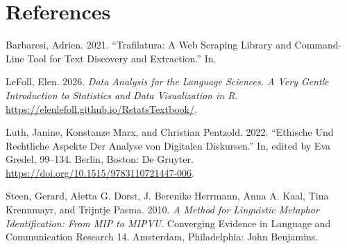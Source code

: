 \documentclass[
  letterpaper,
  DIV=11,
  numbers=noendperiod]{scrreprt}
\newlength{\cslhangindent}
\newenvironment{CSLReferences}[2] %
 {\begin{list}{}{%
  \setlength{\itemindent}{0pt}
  \setlength{\leftmargin}{0pt}
  \setlength{\parsep}{0pt}
  \ifodd #1
   \setlength{\leftmargin}{\cslhangindent}
   \setlength{\itemindent}{-1\cslhangindent}
  \fi
  \setlength{\itemsep}{#2\baselineskip}}}
 {\end{list}}
\begin{document}

\chapter*{References}\label{references}


\label{refs}
\begin{CSLReferences}{1}{0}
Barbaresi, Adrien. 2021. {``Trafilatura: A Web Scraping Library and
Command-Line Tool for Text Discovery and Extraction.''} In.

LeFoll, Elen. 2026. \emph{Data Analysis for the Language Sciences. {A}
Very Gentle Introduction to Statistics and Data Visualization in {R}}.
\url{https://elenlefoll.github.io/RstatsTextbook/}.

Luth, Janine, Konstanze Marx, and Christian Pentzold. 2022. {``Ethische
Und Rechtliche Aspekte Der Analyse von Digitalen Diskursen.''} In,
edited by Eva Gredel, 99--134. Berlin, Boston: De Gruyter.
\url{https://doi.org/10.1515/9783110721447-006}.

Steen, Gerard, Aletta G. Dorst, J. Berenike Herrmann, Anna A. Kaal, Tina
Krennmayr, and Trijntje Pasma. 2010. \emph{A Method for Linguistic
Metaphor Identification: From {MIP} to {MIPVU}}. Converging Evidence in
Language and Communication Research 14. Amsterdam, Philadelphia: John
Benjamins.

\end{CSLReferences}
\end{document}
